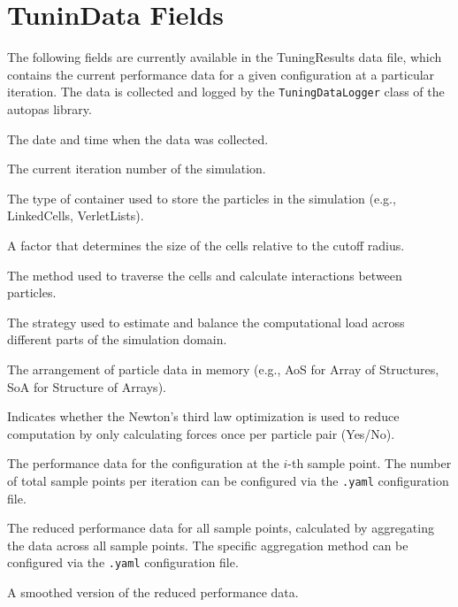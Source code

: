 \section{TuninData Fields}
\label{des:tuningdatafields}

The following fields are currently available in the TuningResults data file, which contains the current performance data for a given configuration at a particular iteration. The data is collected and logged by the \texttt{TuningDataLogger} class of the \gls{autopas} library.

\begin{description}[style=multiline, leftmargin =40mm]
    \item[Date] The date and time when the data was collected.
    \item[Iteration] The current iteration number of the simulation.
    \item[Container] The type of container used to store the particles in the simulation (e.g., LinkedCells, VerletLists).
    \item[CellSizeFactor] A factor that determines the size of the cells relative to the cutoff radius. 
    \item[Traversal] The method used to traverse the cells and calculate interactions between particles.
    \item[Load Estimator] The strategy used to estimate and balance the computational load across different parts of the simulation domain.
    \item[Data Layout] The arrangement of particle data in memory (e.g., AoS for Array of Structures, SoA for Structure of Arrays).
    \item[Newton 3] Indicates whether the Newton's third law optimization is used to reduce computation by only calculating forces once per particle pair (Yes/No).
    \item[sample$i$] The performance data for the configuration at the $i$-th sample point. The number of total sample points per iteration can be configured via the \texttt{.yaml} configuration file.
    \item[Reduced] The reduced performance data for all sample points, calculated by aggregating the data across all sample points. The specific aggregation method can be configured via the \texttt{.yaml} configuration file.
    \item[Smoothed] A smoothed version of the reduced performance data.

\end{description}


